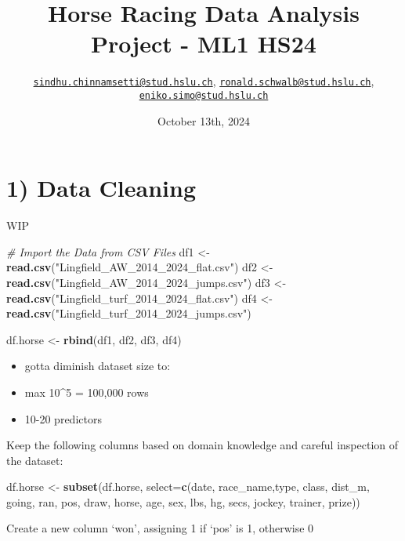 \documentclass[
]{article}
\title{Horse Racing Data Analysis Project - ML1 HS24}
\author{\href{mailto:sindhu.chinnamsetti@stud.hslu.ch}{\nolinkurl{sindhu.chinnamsetti@stud.hslu.ch}},
\href{mailto:ronald.schwalb@stud.hslu.ch}{\nolinkurl{ronald.schwalb@stud.hslu.ch}},
\href{mailto:eniko.simo@stud.hslu.ch}{\nolinkurl{eniko.simo@stud.hslu.ch}}}
\date{October 13th, 2024}
\newenvironment{Shaded}{\begin{snugshade}}{\end{snugshade}}
\newcommand{\AttributeTok}[1]{\textcolor[rgb]{0.13,0.29,0.53}{#1}}
\newcommand{\CommentTok}[1]{\textcolor[rgb]{0.56,0.35,0.01}{\textit{#1}}}
\newcommand{\FunctionTok}[1]{\textcolor[rgb]{0.13,0.29,0.53}{\textbf{#1}}}
\newcommand{\NormalTok}[1]{#1}
\newcommand{\OtherTok}[1]{\textcolor[rgb]{0.56,0.35,0.01}{#1}}
\newcommand{\StringTok}[1]{\textcolor[rgb]{0.31,0.60,0.02}{#1}}
\providecommand{\tightlist}{%
  \setlength{\itemsep}{0pt}\setlength{\parskip}{0pt}}
\begin{document}
\maketitle

\section{1) Data Cleaning}\label{data-cleaning}

{WIP}

\begin{Shaded}
\begin{Highlighting}[]
\CommentTok{\# Import the Data from CSV Files}
\NormalTok{df1 }\OtherTok{\textless{}{-}} \FunctionTok{read.csv}\NormalTok{(}\StringTok{"Lingfield\_AW\_2014\_2024\_flat.csv"}\NormalTok{)}
\NormalTok{df2 }\OtherTok{\textless{}{-}} \FunctionTok{read.csv}\NormalTok{(}\StringTok{"Lingfield\_AW\_2014\_2024\_jumps.csv"}\NormalTok{)}
\NormalTok{df3 }\OtherTok{\textless{}{-}} \FunctionTok{read.csv}\NormalTok{(}\StringTok{"Lingfield\_turf\_2014\_2024\_flat.csv"}\NormalTok{)}
\NormalTok{df4 }\OtherTok{\textless{}{-}} \FunctionTok{read.csv}\NormalTok{(}\StringTok{"Lingfield\_turf\_2014\_2024\_jumps.csv"}\NormalTok{)}

\NormalTok{df.horse }\OtherTok{\textless{}{-}} \FunctionTok{rbind}\NormalTok{(df1, df2, df3, df4)}
\end{Highlighting}
\end{Shaded}

\begin{itemize}
\tightlist
\item
  gotta diminish dataset size to:
\item
  max 10\^{}5 = 100,000 rows
\item
  10-20 predictors
\end{itemize}

Keep the following columns based on domain knowledge and careful
inspection of the dataset:

\begin{Shaded}
\begin{Highlighting}[]
\NormalTok{df.horse }\OtherTok{\textless{}{-}} \FunctionTok{subset}\NormalTok{(df.horse, }\AttributeTok{select=}\FunctionTok{c}\NormalTok{(date, race\_name,type, class, dist\_m, going, ran, pos, draw, horse, age, sex, lbs, hg, secs, jockey, trainer, prize))}
\end{Highlighting}
\end{Shaded}

Create a new column `won', assigning 1 if `pos' is 1, otherwise 0
\end{document}
